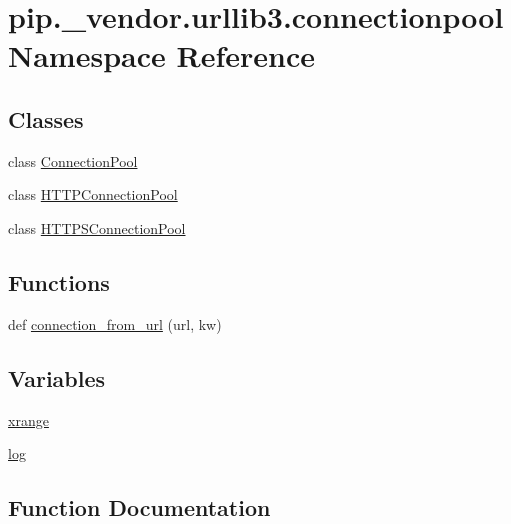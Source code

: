 \hypertarget{namespacepip_1_1__vendor_1_1urllib3_1_1connectionpool}{}\section{pip.\+\_\+vendor.\+urllib3.\+connectionpool Namespace Reference}
\label{namespacepip_1_1__vendor_1_1urllib3_1_1connectionpool}
\subsection*{Classes}
\begin{DoxyCompactItemize}
\item 
class \hyperlink{classpip_1_1__vendor_1_1urllib3_1_1connectionpool_1_1ConnectionPool}{Connection\+Pool}
\item 
class \hyperlink{classpip_1_1__vendor_1_1urllib3_1_1connectionpool_1_1HTTPConnectionPool}{H\+T\+T\+P\+Connection\+Pool}
\item 
class \hyperlink{classpip_1_1__vendor_1_1urllib3_1_1connectionpool_1_1HTTPSConnectionPool}{H\+T\+T\+P\+S\+Connection\+Pool}
\end{DoxyCompactItemize}
\subsection*{Functions}
\begin{DoxyCompactItemize}
\item 
def \hyperlink{namespacepip_1_1__vendor_1_1urllib3_1_1connectionpool_aa083afaea0553436733cc193d35ad162}{connection\+\_\+from\+\_\+url} (url, kw)
\end{DoxyCompactItemize}
\subsection*{Variables}
\begin{DoxyCompactItemize}
\item 
\hyperlink{namespacepip_1_1__vendor_1_1urllib3_1_1connectionpool_af4fe29676fd273dfca039e3b53b7c92d}{xrange}
\item 
\hyperlink{namespacepip_1_1__vendor_1_1urllib3_1_1connectionpool_a1bff2928ed0d70d7b462c2014699e21a}{log}
\end{DoxyCompactItemize}


\subsection{Function Documentation}
\mbox{\label{namespacepip_1_1__vendor_1_1urllib3_1_1connectionpool_aa083afaea0553436733cc193d35ad162}} 

